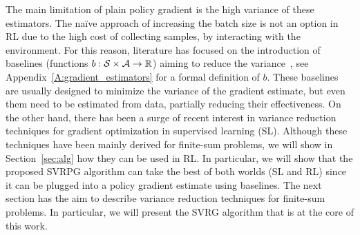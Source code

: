 The main limitation of plain policy gradient is the high variance of these estimators.
The na\"ive approach of increasing the batch size is not an option in RL due to the high cost of collecting samples, \ie by interacting with the environment.
For this reason, literature has focused on the introduction of baselines (\ie functions $b : \mathcal{S} \times \mathcal{A} \to \mathbb R$) aiming to reduce the variance~\citep[\eg][]{williams1992simple,Peters2008reinf,Thomas2017actionbaseline,wu2018variance}, see Appendix~\ref{A:gradient_estimators} for a formal definition of $b$.
These baselines are usually designed to minimize the variance of the gradient estimate, but even them need to be estimated from data, partially reducing their effectiveness.
On the other hand, there has been a surge of recent interest in variance reduction techniques for gradient optimization in supervised learning (SL).
Although these techniques have been mainly derived for finite-sum problems, we will show in Section~\ref{sec:alg} how they can be used in RL.
In particular, we will show that the proposed SVRPG algorithm can take the best of both worlds (\ie SL and RL) since it can be plugged into a policy gradient estimate using baselines.
The next section has the aim to describe variance reduction techniques for finite-sum problems. In particular, we will present the SVRG algorithm that is at the core of this work.


\vspace{-0.05in}
